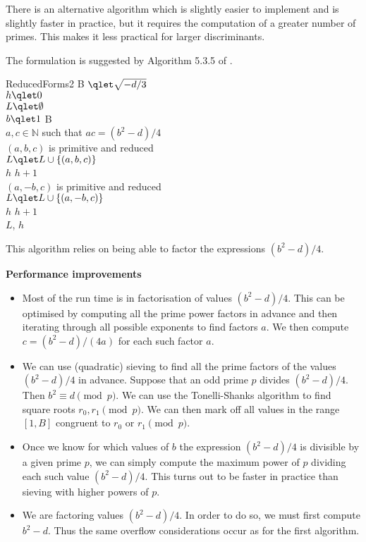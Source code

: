 \documentclass[a4paper,10pt]{amsart}
\newcommand{\N}{\mathbb{N}}
\begin{document}
There is an alternative algorithm which is slightly easier to implement and is slightly faster in practice, but it requires the computation of a greater number of primes. This makes it less practical for larger discriminants.

The formulation is suggested by Algorithm 5.3.5 of \cite{cohen}.

\begin{algorithm}{ReducedForms2}{
   }
B $\qlet \sqrt{-d/3}$ \\
$h \qlet 0$ \\
$L \qlet \emptyset$ \\
\qfor $b \qlet 1$ \qto B \\
\qfor $a, c \in \N$ such that $ac = (b^2 - d)/4$ \\
\qif $(a, b, c)$ is primitive and reduced \\
\qthen $L \qlet L \cup \{(a, b, c)\}$ \\
$h$ \qlet $h + 1$ \qfi \\
\qif $(a, -b, c)$ is primitive and reduced \\
\qthen $L \qlet L \cup \{(a, -b, c)\}$ \\
$h$ \qlet $h + 1$ \qfi \qrof \qrof \\
\qreturn $L$, $h$
\end{algorithm}

This algorithm relies on being able to factor the expressions $(b^2 - d)/4$. 

\textbf{Performance improvements}

\begin{itemize}
\item Most of the run time is in factorisation of values $(b^2 - d)/4$. This can be optimised by computing all the prime power factors in advance and then iterating through all possible exponents to find factors $a$. We then compute $c = (b^2 - d)/(4a)$ for each such factor $a$.

\item We can use (quadratic) sieving to find all the prime factors of the values $(b^2 - d)/4$ in advance. Suppose that an odd prime $p$ divides $(b^2 - d)/4$. Then $b^2 \equiv d \pmod{p}$. We can use the Tonelli-Shanks algorithm to find square roots $r_0, r_1 \pmod{p}$. We can then mark off all values in the range $[1, B]$ congruent to $r_0$ or $r_1 \pmod{p}$.

\item Once we know for which values of $b$ the expression $(b^2 - d)/4$ is divisible by a given prime $p$, we can simply compute the maximum power of $p$ dividing each such value $(b^2 - d)/4$. This turns out to be faster in practice than sieving with higher powers of $p$. 

\item We are factoring values $(b^2 - d)/4$. In order to do so, we must first compute $b^2 - d$. Thus the same overflow considerations occur as for the first algorithm.
\end{itemize}
\end{document}

